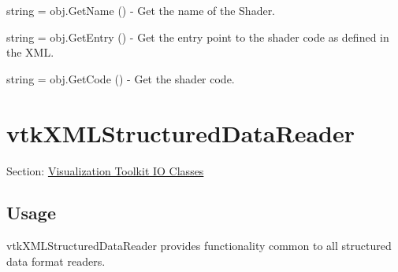 \begin{DoxyItemize}
\item {\ttfamily string = obj.\-Get\-Name ()} -\/ Get the name of the Shader.  
\item {\ttfamily string = obj.\-Get\-Entry ()} -\/ Get the entry point to the shader code as defined in the X\-M\-L.  
\item {\ttfamily string = obj.\-Get\-Code ()} -\/ Get the shader code.  
\end{DoxyItemize}\hypertarget{vtkio_vtkxmlstructureddatareader}{}\section{vtk\-X\-M\-L\-Structured\-Data\-Reader}\label{vtkio_vtkxmlstructureddatareader}
Section\-: \hyperlink{sec_vtkio}{Visualization Toolkit I\-O Classes} \hypertarget{vtkwidgets_vtkxyplotwidget_Usage}{}\subsection{Usage}\label{vtkwidgets_vtkxyplotwidget_Usage}
vtk\-X\-M\-L\-Structured\-Data\-Reader provides functionality common to all structured data format readers.

